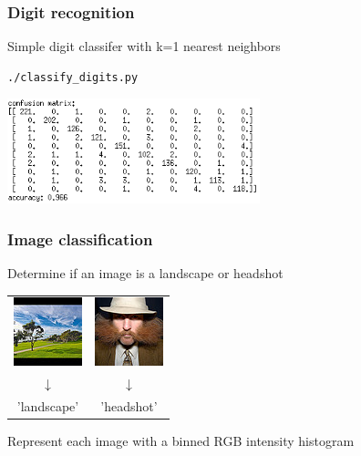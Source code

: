 \begin{frame}[fragile]
  \frametitle{Digit recognition}

  \begin{center}
    \begin{block}{Simple digit classifer with k=1 nearest neighbors}
        \begin{lstlisting}[language=bash]
 ./classify_digits.py
        \end{lstlisting}
    \end{block}
    \vskip20pt
    \includegraphics[width=0.55\textwidth]{digits_confmat.png}
  \end{center}
\end{frame}



\begin{frame}
  \frametitle{Image classification}

  \begin{center}
    Determine if an image is a landscape or headshot
    \vskip20pt
      \begin{tabular}{cc}
        \includegraphics[height=0.2\textheight]{landscape.jpg} & \includegraphics[height=0.2\textheight]{headshot.jpg} \\
        $\downarrow$ & $\downarrow$ \\
        'landscape' & 'headshot'
      \end{tabular}
    \vskip20pt
    Represent each image with a binned RGB intensity histogram

  \end{center}
\end{frame}


